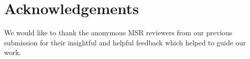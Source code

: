 \documentclass{sig-alternate-05-2015}
\begin{document}
\section*{Acknowledgements}

We would like to thank the anonymous MSR reviewers from our previous submission for their insightful and helpful feedback which helped to guide our work. %

\vspace{5mm}

\balance


\end{document}
